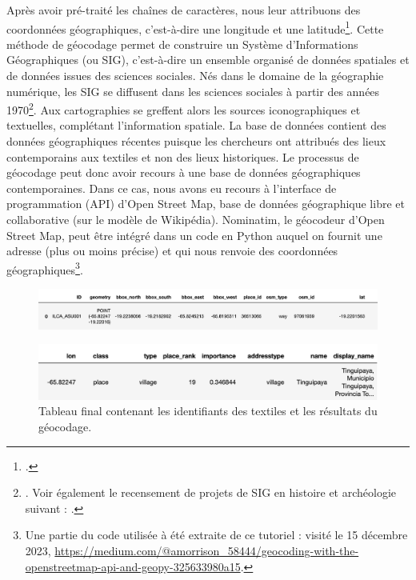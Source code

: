 Après avoir pré-traité les chaînes de caractères, nous leur attribuons des coordonnées géographiques, c'est-à-dire une longitude et une latitude\footcite[p.~34]{goldbergTextGeographicCoordinates2007}. Cette méthode de géocodage permet de construire un Système d'Informations Géographiques (ou SIG), c'est-à-dire un ensemble organisé de données spatiales et de données issues des sciences sociales. Nés dans le domaine de la géographie numérique, les SIG se diffusent dans les sciences sociales à partir des années 1970\footnote{\cite[par.~3]{brandoIntroductionHumanitesNumeriques2021}. Voir également le recensement de projets de SIG en histoire et archéologie suivant : \cite{abaranesBibliographieAnalyseSpatiale2021}.}. Aux cartographies se greffent alors les sources iconographiques et textuelles, complétant l'information spatiale.
La base de données contient des données géographiques récentes puisque les chercheurs  ont attribués des lieux contemporains aux textiles et non des lieux historiques. Le processus de géocodage peut donc avoir recours à une base de données géographiques contemporaines. 
Dans ce cas, nous avons eu recours à l'interface de programmation (API) d'Open Street Map, base de données géographique libre et collaborative (sur le modèle de Wikipédia). Nominatim, le géocodeur d'Open Street Map, peut être intégré dans un code en Python auquel on fournit une adresse (plus ou moins précise) et qui nous renvoie des coordonnées géographiques\footnote{Une partie du code utilisée à été extraite de ce tutoriel : visité le 15 décembre 2023, \url{https://medium.com/@amorrison_58444/geocoding-with-the-openstreetmap-api-and-geopy-325633980a15}.}. 

 \begin{figure}[!h]
	\begin{center}
		\includegraphics[width=15cm]{../images/gdf_places_prod.png}
	 \end{center}
\end{figure}
 \begin{figure}[!h]
	\begin{center}
		\includegraphics[width=12cm]{../images/gdf_places_prod2.png}
	 \end{center}
	 \caption{Tableau final contenant les identifiants des textiles et les résultats du géocodage.}
	 \label{fig:gdf_places_prod}
\end{figure}

